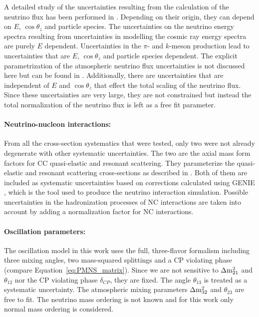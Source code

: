 A detailed study of the uncertainties resulting from the calculation of the neutrino flux has been performed in \cite{2006PhRvD..74i4009B}.
Depending on their origin, they can depend on $E$, $\cos\theta_z$ and particle species.
The uncertainties on the neutrino energy spectra resulting from uncertainties in modelling the cosmic ray energy spectra are purely $E$ dependent.
Uncertainties in the $\pi$- and $k$-meson production lead to uncertainties that are $E$, $\cos\theta_z$ and particle species dependent.
The explicit parametrization of the atmospheric neutrino flux uncertainties is not discussed here but can be found in \cite{2019PhRvD..99c2007A}.
Additionally, there are uncertainties that are independent of $E$ and $\cos\theta_z$ that effect the total scaling of the neutrino flux.
Since these uncertainties are very large, they are not constrained but instead the total normalization of the neutrino flux is left as a free fit parameter.


\paragraph{Neutrino-nucleon interactions:}

From all the cross-section systematics that were tested, only two were not already degenerate with other systematic uncertainties.
The two are the axial mass form factors for CC quasi-elastic and resonant scattering.
They parameterize the quasi-elastic and resonant scattering cross-sections as described in \cite{Formaggio_Cross_Sections}.
Both of them are included as systematic uncertainties based on corrections calculated using GENIE \cite{2015arXiv151005494A}, which is the tool used to produce the neutrino interaction simulation.
Possible uncertainties in the hadronization processes of NC interactions are taken into account by adding a normalization factor for NC interactions.


\paragraph{Oscillation parameters:}

The oscillation model in this work uses the full, three-flavor formalism including three mixing angles, two mass-squared splittings and a CP violating phase (compare Equation~\ref{eq:PMNS_matrix}).
Since we are not sensitive to $\Delta \rm{m}^{2}_{21}$ and $\theta_{12}$ nor the CP violating phase $\delta_{CP}$, they are fixed.
The angle $\theta_{13}$ is treated as a systematic uncertainty. 
The atmospheric mixing parameters $\Delta \rm{m}^{2}_{32}$ and $\theta_{23}$ are free to fit.
The neutrino mass ordering is not known and for this work only normal mass ordering is considered.



